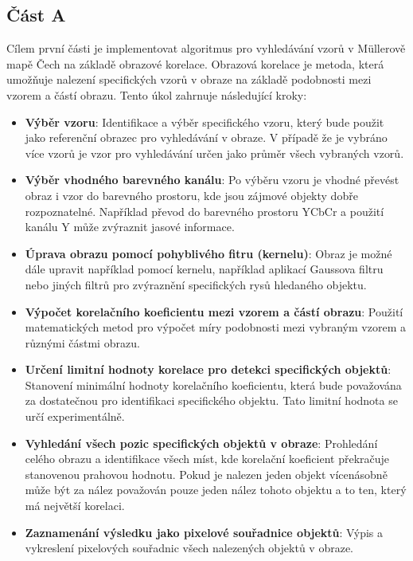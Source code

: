 \subsection*{Část A}

Cílem první části je implementovat algoritmus pro vyhledávání vzorů v Müllerově mapě Čech na základě obrazové korelace. Obrazová korelace je metoda, která umožňuje nalezení specifických vzorů v obraze na základě podobnosti mezi vzorem a částí obrazu. Tento úkol zahrnuje následující kroky:

\begin{itemize}
    \item \textbf{Výběr vzoru}: Identifikace a výběr specifického vzoru, který bude použit jako referenční obrazec pro vyhledávání v obraze. V případě že je vybráno více vzorů je vzor pro vyhledávání určen jako průměr všech vybraných vzorů.
    \item \textbf{Výběr vhodného barevného kanálu}: Po výběru vzoru je vhodné převést obraz i vzor do barevného prostoru, kde jsou zájmové objekty dobře rozpoznatelné. Například převod do barevného prostoru YCbCr a použití kanálu Y může zvýraznit jasové informace.
    \item \textbf{Úprava obrazu pomocí pohyblivého fitru (kernelu)}: Obraz je možné dále upravit například pomocí kernelu, například aplikací Gaussova filtru nebo jiných filtrů pro zvýraznění specifických rysů hledaného objektu.
    \item \textbf{Výpočet korelačního koeficientu mezi vzorem a částí obrazu}: Použití matematických metod pro výpočet míry podobnosti mezi vybraným vzorem a různými částmi obrazu.
    \item \textbf{Určení limitní hodnoty korelace pro detekci specifických objektů}: Stanovení minimální hodnoty korelačního koeficientu, která bude považována za dostatečnou pro identifikaci specifického objektu. Tato limitní hodnota se určí experimentálně.
    \item \textbf{Vyhledání všech pozic specifických objektů v obraze}: Prohledání celého obrazu a identifikace všech míst, kde korelační koeficient překračuje stanovenou prahovou hodnotu. Pokud je nalezen jeden objekt vícenásobně může být za nález považován pouze jeden nález tohoto objektu a to ten, který má největší korelaci.
    \item \textbf{Zaznamenání výsledku jako pixelové souřadnice objektů}: Výpis a vykreslení pixelových souřadnic všech nalezených objektů v obraze.
\end{itemize}